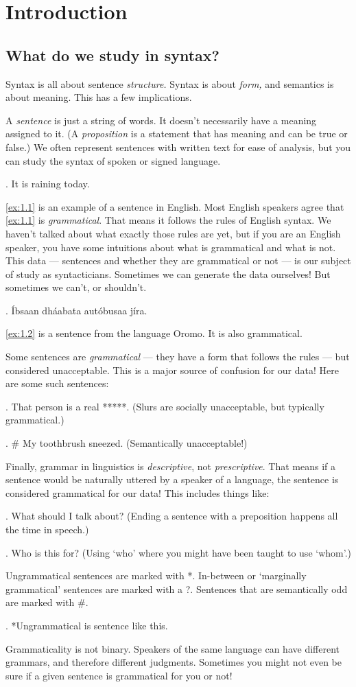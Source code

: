 \chapter{Introduction}
\section{What do we study in syntax?}

Syntax is all about sentence \emph{structure.} Syntax is about \emph{form,} and semantics is about meaning. This has a few implications.

A \emph{sentence} is just a string of words. It doesn't necessarily have a meaning assigned to it. (A \emph{proposition} is a statement that has meaning and can be true or false.) We often represent sentences with written text for ease of analysis, but you can study the syntax of spoken or signed language.

\ex. It is raining today. \label{ex:1.1}

\ref{ex:1.1} is an example of a sentence in English. Most English speakers agree that \ref{ex:1.1} is \emph{grammatical}. That means it follows the rules of English syntax. We haven't talked about what exactly those rules are yet, but if you are an English speaker, you have some intuitions about what is grammatical and what is not. This data --- sentences and whether they are grammatical or not --- is our subject of study as syntacticians. Sometimes we can generate the data ourselves! But sometimes we can't, or shouldn't.

\ex. Íbsaan dháabata autóbusaa jíra. \label{ex:1.2}

\ref{ex:1.2} is a sentence from the language Oromo. It is also grammatical.

Some sentences are \emph{grammatical} --- they have a form that follows the rules --- but considered unacceptable. This is a major source of confusion for our data! Here are some such sentences:

\ex. That person is a real *****.
(Slurs are socially unacceptable, but typically grammatical.)

\ex. \# My toothbrush sneezed.
(Semantically unacceptable!)

Finally, grammar in linguistics is \emph{descriptive}, not \emph{prescriptive}. That means if a sentence would be naturally uttered by a speaker of a language, the sentence is considered grammatical for our data! This includes things like:

\ex. What should I talk about?
(Ending a sentence with a preposition happens all the time in speech.)

\ex. Who is this for?
(Using `who' where you might have been taught to use `whom'.)

Ungrammatical sentences are marked with *.
In-between or `marginally grammatical' sentences are marked with a ?.
Sentences that are semantically odd are marked with \#.

\ex. *Ungrammatical is sentence like this.

Grammaticality is not binary. Speakers of the same language can have different grammars, and therefore different judgments. Sometimes you might not even be sure if a given sentence is grammatical for you or not!
